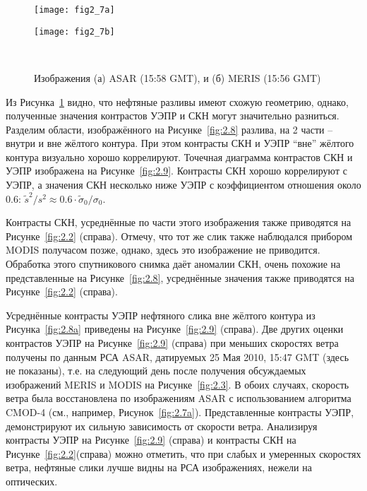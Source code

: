 \begin{figure}[H]
   	\centering
	\begin{minipage}{.49\textwidth}
	    \subcaptionbox{\label{fig:2.7a}}
		{\texttt{[image: fig2\_7a]}}
	\end{minipage}
	\hfill
	\begin{minipage}{.49\textwidth}
	    \subcaptionbox{\label{fig:2.7b}}
		{\texttt{[image: fig2\_7b]}}
	\end{minipage}
    \\
    \caption{Изображения (а) ASAR (15:58 GMT), и (б) MERIS (15:56 GMT)}
    \label{fig:2.7}
\end{figure}


Из Рисунка~\ref{fig:2.7} видно, что нефтяные разливы имеют схожую геометрию, однако, полученные значения контрастов УЭПР и СКН могут значительно разниться. Разделим области, изображённого на Рисунке~\ref{fig:2.8} разлива, на 2 части -- внутри и вне жёлтого контура. При этом контрасты СКН и УЭПР ``вне'' жёлтого контура визуально хорошо коррелируют. Точечная диаграмма контрастов СКН и УЭПР изображена на Рисунке~\ref{fig:2.9}. Контрасты СКН хорошо коррелируют с УЭПР, а значения СКН несколько ниже УЭПР с коэффициентом отношения около 0.6: $\tilde{s}^{2} /s^{2} \approx 0.6\cdot \tilde{\sigma }_{0} /\sigma _{0}$.

Контрасты СКН, усреднённые по части этого изображения также приводятся на Рисунке~\ref{fig:2.2} (справа). Отмечу, что тот же слик также наблюдался прибором MODIS получасом позже, однако, здесь это изображение не приводится. Обработка этого спутникового снимка даёт аномалии СКН, очень похожие на представленные на Рисунке~\ref{fig:2.8}, усреднённые значения также приводятся на Рисунке~\ref{fig:2.2} (справа).

Усреднённые контрасты УЭПР нефтяного слика вне жёлтого контура из Рисунка~\ref{fig:2.8a} приведены на Рисунке~\ref{fig:2.9} (справа). Две других оценки контрастов УЭПР на Рисунке~\ref{fig:2.9} (справа) при меньших скоростях ветра получены по данным РСА ASAR, датируемых 25 Мая 2010, 15:47 GMT (здесь не показаны), т.е. на следующий день после получения обсуждаемых изображений MERIS и MODIS на Рисунке~\ref{fig:2.3}. В обоих случаях, скорость ветра была восстановлена по изображениям ASAR с использованием алгоритма CMOD-4 (см., например, Рисунок~\ref{fig:2.7a}). Представленные контрасты УЭПР, демонстрируют их сильную зависимость от скорости ветра. Анализируя контрасты УЭПР на Рисунке~\ref{fig:2.9} (справа) и контрасты СКН на Рисунке~\ref{fig:2.2}(справа) можно отметить, что при слабых и умеренных скоростях ветра, нефтяные слики лучше видны на РСА изображениях, нежели на оптических.



